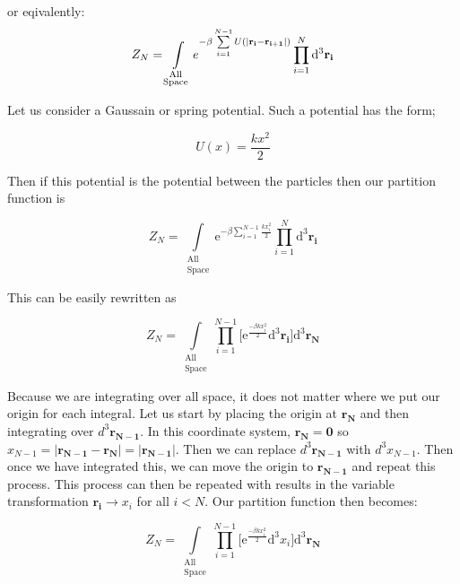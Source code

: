 \documentclass{article}
\begin{document}
or eqivalently:
\begin{equation}
Z_N=\int\limits_{\substack{\text{All} \\  \text{Space}}} \mathrm\mathrm{e}^{-\beta\sum\limits_{i=1}^{N-1}U(|\mathbf{r_i-r_{i+1}}|)}\prod\limits_{i=1}^N \mathrm{d}^3\mathbf{r_i}
\end{equation}

Let us consider a Gaussain or spring potential. Such a potential has the form;

\begin{equation}
U(x)=\frac{kx^2}{2}
\end{equation}

Then if this potential is the potential between the particles then our partition function is 

\begin{equation}
Z_N=\int\limits_{\substack{\text{All} \\  \text{Space}}} \mathrm{e}^{-\beta\sum\limits_{i=1}^{N-1}\frac{kx_i^2}{2}}\prod\limits_{i=1}^N \mathrm{d}^3\mathbf{r_i}
\end{equation}

This can be easily rewritten as 

\begin{equation}
Z_N=\int\limits_{\substack{\text{All} \\  \text{Space}}}\prod\limits_{i=1}^{N-1}\Big[ \mathrm{e}^{\frac{-\beta kx_i^2}{2}} \mathrm{d}^3\mathbf{r_i}\Big]\mathrm{d}^3\mathbf{r_N}
\end{equation}

Because we are integrating over all space, it does not matter where we put our origin for each integral. Let us start by placing the origin at \(\mathbf{r_N}\) and then integrating over \({d}^3\mathbf{r_{N-1}}\). In this coordinate system, \(\mathbf{r_N} = \mathbf{0}\)  so \(x_{N-1} = |\mathbf{r_{N-1}-r_N}|=|\mathbf{r_{N-1}}|\). Then we can replace  \({d}^3\mathbf{r_{N-1}}\) with \({d}^3x_{N-1}\). Then once we have integrated this, we can move the origin to \(\mathbf{r_{N-1}}\)  and repeat this process. This process can then be repeated with results in the variable transformation \(\mathbf{r_i} \rightarrow x_i\) for all \(i<N\). Our partition function then becomes:

\begin{equation}
Z_N=\int\limits_{\substack{\text{All} \\  \text{Space}}}\prod\limits_{i=1}^{N-1}\Big[ \mathrm{e}^{\frac{-\beta kx_i^2}{2}} \mathrm{d}^3 x_i \Big]\mathrm{d}^3\mathbf{r_N}
\end{equation}
\end{document}
